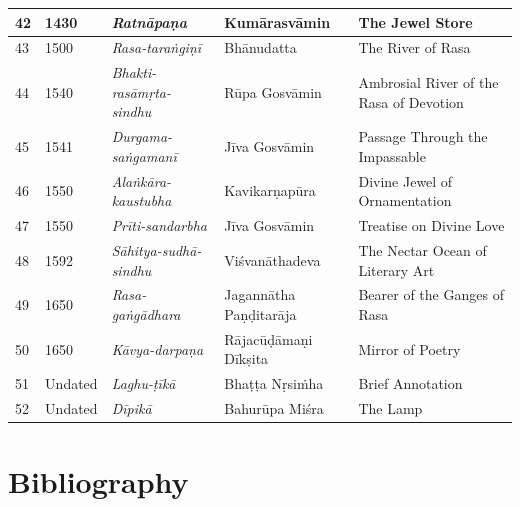 \begin{longtable}{|l|p{1.1cm}|p{1.97cm}|p{1.98cm}|p{1.97cm}|}
\hline
42 & 1430 & \textit{Ratnāpaṇa}\index{Ratnapana@\textit{Ratnāpaṇa}} & Kumārasvāmin\index{Kumarasvamin@Kumārasvāmin} & The Jewel Store \\
\hline
43 & 1500 & \textit{Rasa-taraṅgiṇī}\index{Rasatarangini@\textit{Rasa-taraṅgiṇī}} & Bhānudatta\index{Bhanudatta@Bhānudatta} & The River of Rasa \\
\hline
44 & 1540 & \textit{Bhakti-rasāmṛta-sindhu}\index{Bhaktirasamrtasindhu@\textit{Bhakti-rasāmṛta-sindhu}} & Rūpa Gosvāmin\index{Rupa Gosvamin@Rūpa Gosvāmin} & Ambrosial River of the Rasa of Devotion \\
\hline
45 & 1541 & \textit{Durgama-saṅgamanī}\index{Durgamasangamani@\textit{Durgama-saṅgamanī}} & Jīva Gosvāmin\index{Jiva Gosvamin@Jīva Gosvāmin} & Passage Through the Impassable \\
\hline
46 & 1550 & \textit{Alaṅkāra-kaustubha}\index{Alankarakaustubha@\textit{Alaṅkāra-kaustubha}} & Kavikarṇapūra\index{Kavikarnapura@Kavikarṇapūra} & Divine Jewel of Ornamentation \\
\hline
47 & 1550 & \textit{Prīti-sandarbha}\index{Pritisandarbha@\textit{Prīti-sandarbha}} & Jīva Gosvāmin & Treatise on Divine Love \\
\hline
48 & 1592 & \textit{Sāhitya-sudhā-sindhu}\index{Sahityasudhasindhu@\textit{Sāhityasudhā-sindhu}} & Viśvanātha\-deva & The Nectar Ocean of Literary Art \\
\hline
49 & 1650 & \textit{Rasa-gaṅgādhara}\index{Rasagangadhara@\textit{Rasa-gaṅgādhara}} & Jagannātha Paṇḍitarāja\index{Jagannatha Panditaraja@Jagannātha Paṇḍitarāja} & Bearer of the Ganges of Rasa \\
\hline
50 & 1650 & \textit{Kāvya-darpaṇa}\index{Kavyadarpana@\textit{Kāvya-darpaṇa}} & Rājacūḍāmaṇi Dīkṣita\index{Rajacudamani Diksita@Rājacūḍāmaṇi Dīkṣita} & Mirror of Poetry \\
\hline
51 & Undated & \textit{Laghu-ṭīkā}\index{Laghutika@\textit{Laghu-ṭīkā}} & Bhaṭṭa Nṛsiṁha\index{Bhatta Nrsimha@Bhaṭṭa Nṛsiṁha} & Brief Annotation \\
\hline
52 & Undated & \textit{Dīpikā}\index{Dipika@\textit{Dīpikā}} & Bahurūpa Miśra\index{Bahurupa Misra@Bahurūpa Miśra} & The Lamp \\
\hline
\end{longtable}


\section*{Bibliography}

